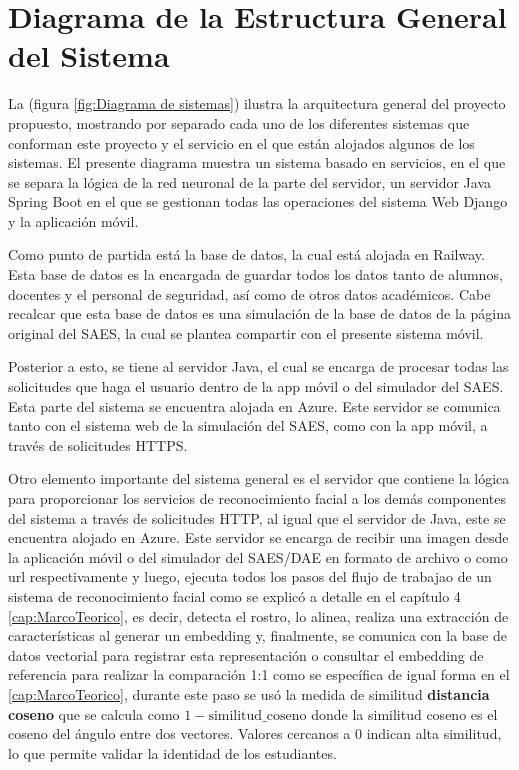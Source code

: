 \section{Diagrama de la Estructura General del Sistema}

La (figura \ref{fig:Diagrama de sistemas}) ilustra la arquitectura general del proyecto propuesto, mostrando por separado cada uno de los diferentes sistemas que conforman este proyecto y el servicio en el que están alojados algunos de los sistemas. 
El presente diagrama muestra un sistema basado en servicios, en el que se separa la lógica de la red neuronal de la parte del servidor, un servidor Java Spring Boot en el que se gestionan todas las operaciones del sistema Web Django y la aplicación móvil.


Como punto de partida está la base de datos, la cual está alojada en Railway. Esta base de datos es la encargada de guardar todos los datos tanto de alumnos, docentes y el personal de seguridad, así como de otros datos académicos. Cabe recalcar que esta base de datos es una simulación de la base de datos de la página original del SAES, la cual se plantea compartir con el presente sistema móvil.


Posterior a esto, se tiene al servidor Java, el cual se encarga de procesar todas las solicitudes que haga el usuario dentro de la app móvil o del simulador del SAES. Esta parte del sistema se encuentra alojada en Azure. Este servidor se comunica tanto con el sistema web de la simulación del SAES, como con la app móvil, a través de solicitudes HTTPS.


Otro elemento importante del sistema general es el servidor que contiene la lógica para proporcionar los servicios de reconocimiento facial a los demás componentes del sistema a través de solicitudes HTTP,  al igual que el servidor de Java, este se encuentra alojado en Azure.
Este servidor se encarga de recibir una imagen desde la aplicación móvil o del simulador del SAES/DAE en formato de archivo o como url respectivamente y luego, ejecuta todos los pasos del flujo de trabajao de un sistema de reconocimiento facial como se explicó a detalle en el capítulo 4 \ref{cap:MarcoTeorico}, es decir, detecta el rostro, lo alinea, realiza una extracción de características al generar un embedding y, finalmente, se comunica con la base de datos vectorial para registrar esta representación o consultar el embedding de referencia para realizar la comparación 1:1 como se específica de igual forma en el \ref{cap:MarcoTeorico}, durante este paso se usó la medida de similitud \textbf{distancia coseno} que se calcula como $1 - \text{similitud\_coseno}$ donde la similitud coseno es el coseno del ángulo entre dos vectores. Valores cercanos a 0 indican alta similitud, lo que permite validar la identidad de los estudiantes.


